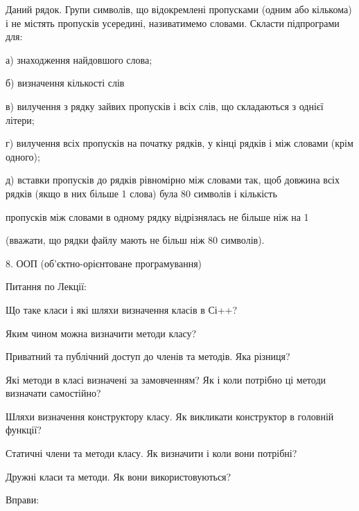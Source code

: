 \documentclass[]{article}
\begin{document}
Даний рядок. Групи символів, що відокремлені пропусками (одним або
кількома) і не містять пропусків усередині, називатимемо словами.
Скласти підпрограми для:

а) знаходження найдовшого слова;

б) визначення кількості слів

в) вилучення з рядку зайвих пропусків і всіх слів, що складаються з
однієї літери;

г) вилучення всіх пропусків на початку рядків, у кінці рядків і між
словами (крім одного);

д) вставки пропусків до рядків рівномірно між словами так, щоб довжина
всіх рядків (якщо в них більше 1 слова) була 80 символів і кількість

пропусків між словами в одному рядку відрізнялась не більше ніж на 1

(вважати, що рядки файлу мають не більш ніж 80 символів).

\protect\hypertarget{_Hlk48906736}{}{}

8. ООП (об'єктно-орієнтоване програмування)

\protect\hypertarget{_Hlk57988688}{}{}

Питання по Лекції:

Що таке класи і які шляхи визначення класів в Сі++?

Яким чином можна визначити методи класу?

Приватний та публічний доступ до членів та методів. Яка різниця?

Які методи в класі визначені за замовченням? Як і коли потрібно ці
методи визначати самостійно?

Шляхи визначення конструктору класу. Як викликати конструктор в головній
функції?

Статичні члени та методи класу. Як визначити і коли вони потрібні?

Дружні класи та методи. Як вони використовуються?

Вправи:
\end{document}
